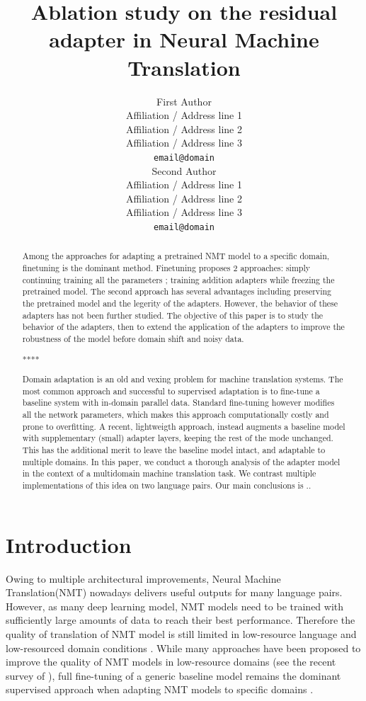 \documentclass[11pt,a4paper]{article}
\title{Ablation study on the residual adapter in Neural Machine Translation}
\author{First Author \\
  Affiliation / Address line 1 \\
  Affiliation / Address line 2 \\
  Affiliation / Address line 3 \\
  \texttt{email@domain} \\\And
  Second Author \\
  Affiliation / Address line 1 \\
  Affiliation / Address line 2 \\
  Affiliation / Address line 3 \\
  \texttt{email@domain} \\}
\date{}
\newcommand{\fyTodo}[1]{\Todo[FY:]{\textcolor{orange}{#1}}}
\newcommand{\mpTodo}[1]{\Todo[MP:]{\textcolor{green}{#1}}}
\begin{document}
\maketitle
\begin{abstract}
Among the approaches for adapting a pretrained NMT model to a specific domain, finetuning is the dominant method. Finetuning proposes 2 approaches: simply continuing training all the parameters \cite{Luong15stanford}; training addition adapters while freezing the pretrained model\cite{bapna19simple, Vilar18learning}. The second approach has several advantages including preserving the pretrained model and the legerity of the adapters. However, the behavior of these adapters has not been further studied. The objective of this paper is to study the behavior of the adapters, then to extend the application of the adapters to improve the robustness of the model before domain shift and noisy data.
\mpTodo{correcting abstract}

**** 

\fyTodo{Citation-free abstract}
Domain adaptation is an old and vexing problem for machine translation systems. The most common approach and successful to supervised adaptation is to fine-tune a baseline system with in-domain parallel data. Standard fine-tuning however modifies all the network parameters, which makes this approach computationally costly and prone to overfitting. A recent, lightweigth approach, instead augments a baseline model with supplementary (small) adapter layers, keeping the rest of the mode unchanged. This has the additional merit to leave the baseline model intact, and adaptable to multiple domains. In this paper, we conduct a thorough analysis of the adapter model in the context of a multidomain machine translation task. We contrast multiple implementations of this idea on two language pairs. Our main conclusions is ..\fyTodo{abstract to be continued}

\end{abstract}

\section{Introduction } \label{sec:intro}
\mpTodo{write introduction} \fyTodo{Citations in chronological order}\fyTodo{Split long sentences}
Owing to multiple architectural improvements, Neural Machine Translation(NMT) \cite{Kalchbrenner13recurrent,Sutskever14sequence Bahdanau15learning,Vaswani17attention} nowadays delivers useful outputs for many language pairs. However, as many deep learning model, NMT models need to be trained with sufficiently large amounts of data to reach their best performance. Therefore the quality of translation of NMT model is still limited in low-resource language and low-resourced domain conditions \cite{duh13adaptation, zoph16transfer,koehn17six}. While many approaches have been proposed to improve the quality of NMT models in low-resource domains (see the recent survey of \citet{Chu18asurvey}), full fine-tuning of a generic baseline model remains the dominant supervised approach when adapting NMT models to specific domains \cite{Luong15stanford,neubig18rapid}.
\end{document}
